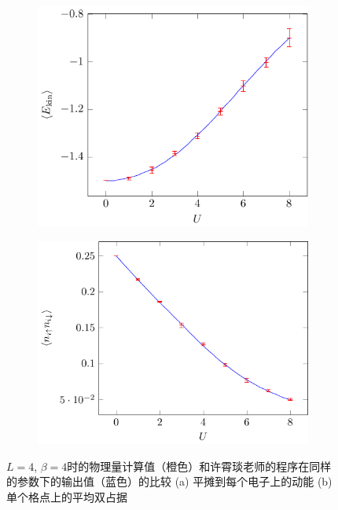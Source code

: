 \documentclass[UTF8]{ctexart}
\begin{document}
\begin{figure}
    \centering
    \begin{subfigure}{0.45\textwidth}
        \includegraphics[width=\textwidth]{../hubbard-report/T_compare.pdf}
        \subcaption{}
    \end{subfigure}
    \begin{subfigure}{0.45\textwidth}
        \includegraphics[width=\textwidth]{../hubbard-report/double_occ_compare.pdf}
        \subcaption{}
    \end{subfigure}
    \caption{$L=4$, $\beta = 4$时的物理量计算值（橙色）和许霄琰老师的程序在同样的参数下的输出值（蓝色）的比较 (a) 平摊到每个电子上的动能 (b) 单个格点上的平均双占据}
    \label{fig:hubbard-dqmc-output}
\end{figure}
\end{document}
